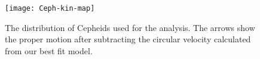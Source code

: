 \documentclass[11pt,a4paper]{article}
\begin{document}
\begin{figure}
\leavevmode
\texttt{[image: Ceph-kin-map]}
\caption{\small
 The distribution of Cepheids used for the analysis. The arrows show the proper motion after subtracting the circular velocity calculated from our best fit model. 
}
\label{fig-Ceph-kin-map}
\end{figure}




\footnotesize

\setlength{\baselineskip}{0pt}
\setlength{\bibsep}{0pt}

\end{document}
